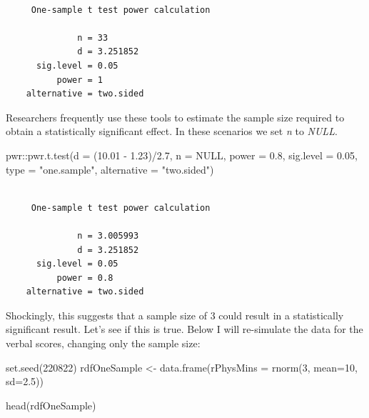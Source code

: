 \documentclass[
  11pt,
]{book}
\newenvironment{Shaded}{\begin{snugshade}}{\end{snugshade}}
\newcommand{\AttributeTok}[1]{\textcolor[rgb]{0.77,0.63,0.00}{#1}}
\newcommand{\ConstantTok}[1]{\textcolor[rgb]{0.00,0.00,0.00}{#1}}
\newcommand{\DecValTok}[1]{\textcolor[rgb]{0.00,0.00,0.81}{#1}}
\newcommand{\FloatTok}[1]{\textcolor[rgb]{0.00,0.00,0.81}{#1}}
\newcommand{\FunctionTok}[1]{\textcolor[rgb]{0.00,0.00,0.00}{#1}}
\newcommand{\NormalTok}[1]{#1}
\newcommand{\OtherTok}[1]{\textcolor[rgb]{0.56,0.35,0.01}{#1}}
\newcommand{\SpecialCharTok}[1]{\textcolor[rgb]{0.00,0.00,0.00}{#1}}
\newcommand{\StringTok}[1]{\textcolor[rgb]{0.31,0.60,0.02}{#1}}
\begin{document}
\begin{verbatim}

     One-sample t test power calculation 

              n = 33
              d = 3.251852
      sig.level = 0.05
          power = 1
    alternative = two.sided
\end{verbatim}

Researchers frequently use these tools to estimate the sample size required to obtain a statistically significant effect. In these scenarios we set \emph{n} to \emph{NULL}.

\begin{Shaded}
\begin{Highlighting}[]
\NormalTok{pwr}\SpecialCharTok{::}\FunctionTok{pwr.t.test}\NormalTok{(}\AttributeTok{d =}\NormalTok{ (}\FloatTok{10.01} \SpecialCharTok{{-}} \FloatTok{1.23}\NormalTok{)}\SpecialCharTok{/}\FloatTok{2.7}\NormalTok{, }\AttributeTok{n =} \ConstantTok{NULL}\NormalTok{, }\AttributeTok{power =} \FloatTok{0.8}\NormalTok{, }\AttributeTok{sig.level =} \FloatTok{0.05}\NormalTok{,}
    \AttributeTok{type =} \StringTok{"one.sample"}\NormalTok{, }\AttributeTok{alternative =} \StringTok{"two.sided"}\NormalTok{)}
\end{Highlighting}
\end{Shaded}

\begin{verbatim}

     One-sample t test power calculation 

              n = 3.005993
              d = 3.251852
      sig.level = 0.05
          power = 0.8
    alternative = two.sided
\end{verbatim}

Shockingly, this suggests that a sample size of 3 could result in a statistically significant result. Let's see if this is true. Below I will re-simulate the data for the verbal scores, changing only the sample size:

\begin{Shaded}
\begin{Highlighting}[]
\FunctionTok{set.seed}\NormalTok{(}\DecValTok{220822}\NormalTok{)}
\NormalTok{rdfOneSample }\OtherTok{\textless{}{-}} \FunctionTok{data.frame}\NormalTok{(}\AttributeTok{rPhysMins =} \FunctionTok{rnorm}\NormalTok{(}\DecValTok{3}\NormalTok{, }\AttributeTok{mean=}\DecValTok{10}\NormalTok{, }\AttributeTok{sd=}\FloatTok{2.5}\NormalTok{))}

\FunctionTok{head}\NormalTok{(rdfOneSample)}
\end{Highlighting}
\end{Shaded}
\end{document}
